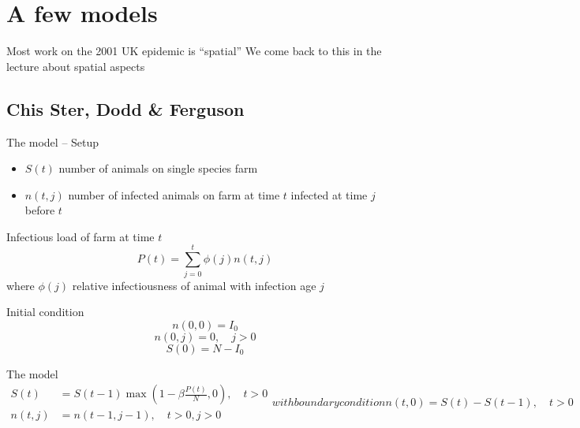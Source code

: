 \documentclass[aspectratio=43]{beamer}
\begin{document}
\section{A few models}


\begin{frame}{Most work on the 2001 UK epidemic is ``spatial''}
  We come back to this in the lecture about spatial aspects
\end{frame}


\subsection{Chis Ster, Dodd \& Ferguson}

\begin{frame}{The model -- Setup}
  \begin{itemize}
    \item $S(t)$ number of animals on single species farm 
    \item $n(t,j)$ number of infected animals on farm at time $t$ infected at time $j$ before $t$
  \end{itemize}
  \vfill
Infectious load of farm at time $t$
\begin{equation}
  P(t)=\sum_{j=0}^t \phi(j)n(t,j)
\end{equation}
where $\phi(j)$ relative infectiousness of animal with infection age $j$
\end{frame}

\begin{frame}{Initial condition}
  \[
    n(0,0)=I_0
  \]
  \vfill
  \[
    n(0,j)=0,\quad j>0
  \]
  \vfill
  \[
    S(0) = N-I_0
  \]
\end{frame}

\begin{frame}{The model}
  \begin{subequations}
    \begin{align}
      S(t) &= S(t-1)\max\left(
        1-\beta \frac{P(t)}{N},0
      \right),\quad t>0 \\
      n(t,j) &= n(t-1,j-1),\quad t>0,j>0
    \end{align}
    with boundary condition
    \begin{equation}
      n(t,0) = S(t)-S(t-1),\quad t>0
    \end{equation}
  \end{subequations} 
\end{frame}
\end{document}
